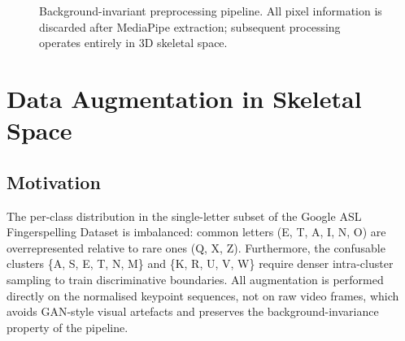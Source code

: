 \documentclass[conference]{IEEEtran}
\begin{document}
\begin{figure}[htbp]
\centering
{}
\caption{Background-invariant preprocessing pipeline. All pixel information is
discarded after MediaPipe extraction; subsequent processing operates entirely
in 3D skeletal space.}
\label{fig:pipeline}
\end{figure}

\section{Data Augmentation in Skeletal Space}
\label{sec:augmentation}

\subsection{Motivation}

The per-class distribution in the single-letter subset of the Google ASL
Fingerspelling Dataset is imbalanced: common letters (E, T, A, I, N, O) are
overrepresented relative to rare ones (Q, X, Z). Furthermore, the confusable
clusters \{A, S, E, T, N, M\} and \{K, R, U, V, W\} require denser intra-cluster
sampling to train discriminative boundaries. All augmentation is performed
directly on the normalised keypoint sequences, not on raw video frames, which
avoids GAN-style visual artefacts and preserves the background-invariance
property of the pipeline.
\end{document}
